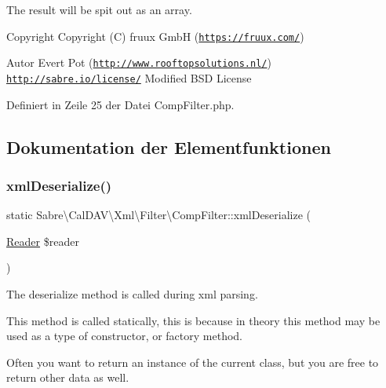The result will be spit out as an array.

\begin{DoxyCopyright}{Copyright}
Copyright (C) fruux GmbH (\href{https://fruux.com/}{\tt https\+://fruux.\+com/}) 
\end{DoxyCopyright}
\begin{DoxyAuthor}{Autor}
Evert Pot (\href{http://www.rooftopsolutions.nl/}{\tt http\+://www.\+rooftopsolutions.\+nl/})  \href{http://sabre.io/license/}{\tt http\+://sabre.\+io/license/} Modified B\+SD License 
\end{DoxyAuthor}


Definiert in Zeile 25 der Datei Comp\+Filter.\+php.



\subsection{Dokumentation der Elementfunktionen}
\mbox{\label{class_sabre_1_1_cal_d_a_v_1_1_xml_1_1_filter_1_1_comp_filter_ad5f79ca22d86d30c5740d95fb90a18be}} 
\subsubsection{\texorpdfstring{xml\+Deserialize()}{xmlDeserialize()}}
{\footnotesize\ttfamily static Sabre\textbackslash{}\+Cal\+D\+A\+V\textbackslash{}\+Xml\textbackslash{}\+Filter\textbackslash{}\+Comp\+Filter\+::xml\+Deserialize (\begin{DoxyParamCaption}\item[{\mbox{\hyperlink{class_sabre_1_1_xml_1_1_reader}{Reader}}}]{\$reader }\end{DoxyParamCaption})\hspace{0.3cm}{\ttfamily [static]}}

The deserialize method is called during xml parsing.

This method is called statically, this is because in theory this method may be used as a type of constructor, or factory method.

Often you want to return an instance of the current class, but you are free to return other data as well.

